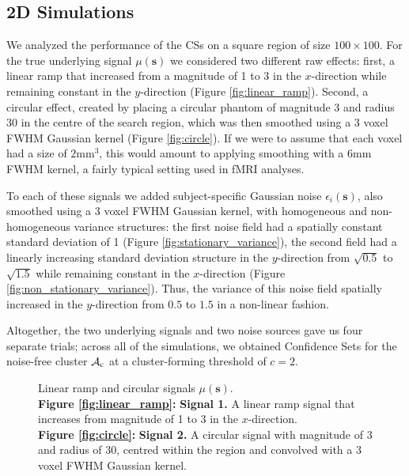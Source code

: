 \subsection{2D Simulations}
\label{sec:2D_simulations}
We analyzed the performance of the CSs on a square region of size $100 \times 100$. For the true underlying signal $\mu(\bm{s})$ we considered two different raw effects: first, a linear ramp that increased from a magnitude of 1 to 3 in the $x$-direction while remaining constant in the $y$-direction (Figure \ref{fig:linear_ramp}). Second, a circular effect, created by placing a circular phantom of magnitude 3 and radius 30 in the centre of the search region, which was then smoothed using a 3 voxel FWHM Gaussian kernel (Figure \ref{fig:circle}). If we were to assume that each voxel had a size of $2$mm$^{3}$, this would amount to applying smoothing with a $6$mm FWHM kernel, a fairly typical setting used in fMRI analyses.

To each of these signals we added subject-specific Gaussian noise $\epsilon_{i}(\bm{s})$, also smoothed using a 3 voxel FWHM Gaussian kernel, with homogeneous and non-homogeneous variance structures: the first noise field had a spatially constant standard deviation of 1 (Figure \ref{fig:stationary_variance}), the second field had a linearly increasing standard deviation structure in the $y$-direction from $\sqrt{0.5}$ to $\sqrt{1.5}$ while remaining constant in the $x$-direction (Figure \ref{fig:non_stationary_variance}). Thus, the variance of this noise field spatially increased in the $y$-direction from $0.5$ to $1.5$ in a non-linear fashion. 

Altogether, the two underlying signals and two noise sources gave us four separate trials; across all of the simulations, we obtained Confidence Sets for the noise-free cluster $\operatorname{\mathcal{A}_{c}}$ at a cluster-forming threshold of $c = 2$. 

\begin{figure}[htbp]\label{fig:2D_signals}%
\centering
{}
\caption{Linear ramp and circular signals $\mu(\bm{s})$. \\ \textbf{Figure \ref{fig:linear_ramp}:} \textbf{Signal 1.} A linear ramp signal that increases from magnitude of 1 to 3 in the $x$-direction. \\ \textbf{Figure \ref{fig:circle}:} \textbf{Signal 2.} A circular signal with magnitude of 3 and radius of 30, centred within the region and convolved with a 3 voxel FWHM Gaussian kernel.}
\end{figure}

